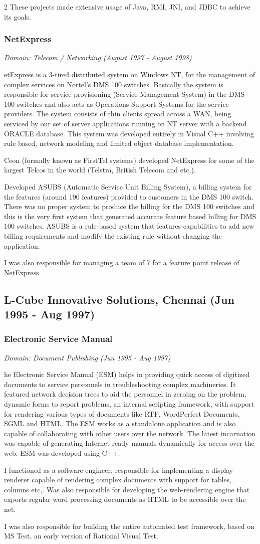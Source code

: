 \documentclass[a4paper,11pt]{article}
\newcommand\cvsubsection[3]{\subsection*{#1 \quad \small{(#2 - #3)}}}
\newcommand\cvprojectentry[5]{
  \subsubsection*{#1}
  
  \vspace{-7pt}
  
  \it{Domain: #2}\normalfont{} \quad (#3 - #4)
  
}
\begin{document}
\begin{multicols}{2}
These projects made extensive usage of Java, RMI, JNI, and JDBC to
achieve its goals.
 
\cvprojectentry{NetExpress}{Telecom / Networking}{August 1997}{August 1998}

NetExpress is a 3-tired distributed system on Windows NT, for the
management of complex services on Nortel’s DMS 100 switches. Basically
the system is responsible for service provisioning (Service Management
System) in the DMS 100 switches and also acts as Operations Support
Systems for the service providers. The system consists of thin clients
spread across a WAN, being serviced by our set of server applications
running on NT server with a backend ORACLE database. This system was
developed entirely in Visual C++ involving rule based, network
modeling and limited object database implementation.
 
Ceon (formally known as FirstTel systems) developed NetExpress for
some of the largest Telcos in the world (Telstra, British Telecom and
etc.).
 
Developed ASUBS (Automatic Service Unit Billing System), a billing
system for the features (around 190 features) provided to customers in
the DMS 100 switch. There was no proper system to produce the billing
for the DMS 100 switches and this is the very first system that
generated accurate feature based billing for DMS 100 switches. ASUBS
is a rule-based system that features capabilities to add new billing
requirements and modify the existing rule without changing the
application.
 
I was also responsible for managing a team of 7 for a feature point
release of NetExpress.

\cvsubsection{L-Cube Innovative Solutions, Chennai}{Jun 1995}{Aug 1997}

\cvprojectentry{Electronic Service Manual}{Document Publishing}{Jun 1995}{Aug 1997}
 
The Electronic Service Manual (ESM) helps in providing quick access of
digitized documents to service personnels in troubleshooting complex
machineries. It featured network decision trees to aid the personnel
in zeroing on the problem, dynamic forms to report problems, an
internal scripting framework, with support for rendering various types
of documents like RTF, WordPerfect Documents, SGML and HTML. The ESM
works as a standalone application and is also capable of collaborating
with other users over the network. The latest incarnation was capable
of generating Internet ready manuals dynamically for access over the
web. ESM was developed using C++.
 
I functioned as a software engineer, responsible for implementing a
display renderer capable of rendering complex documents with support
for tables, columns etc,. Was also responsible for developing the
web-rendering engine that exports regular word processing documents as
HTML to be accessible over the net.
 
I was also responsible for building the entire automated test
framework, based on MS Test, an early version of Rational Visual Test.

\end{multicols}
\end{document}

